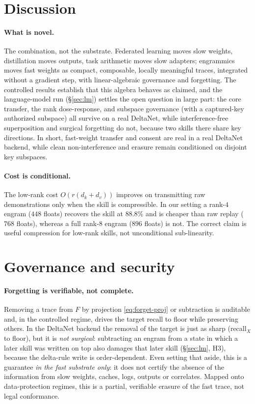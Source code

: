 \documentclass[11pt]{article}
\theoremstyle{definition}
\newcommand{\F}{F}
\newcommand{\dk}{d_k}
\newcommand{\dv}{d_v}
\begin{document}
\section{Discussion}
\label{sec:discussion}

\paragraph{What is novel.}
The combination, not the substrate. Federated learning moves slow weights, distillation moves outputs, task arithmetic moves slow adapters; engrammics moves fast weights as compact, composable, locally meaningful traces, integrated without a gradient step, with linear-algebraic governance and forgetting. The controlled results establish that this algebra behaves as claimed, and the language-model run (\S\ref{sec:lm}) settles the open question in large part: the core transfer, the rank dose-response, and subspace governance (with a captured-key authorized subspace) all survive on a real DeltaNet, while interference-free superposition and surgical forgetting do not, because two skills there share key directions. In short, fast-weight transfer and consent are real in a real DeltaNet backend, while clean non-interference and erasure remain conditioned on disjoint key subspaces.

\paragraph{Cost is conditional.}
The low-rank cost $O(r(\dk+\dv))$ improves on transmitting raw demonstrations only when the skill is compressible. In our setting a rank-$4$ engram ($448$ floats) recovers the skill at $88.8\%$ and is cheaper than raw replay ($768$ floats), whereas a full rank-$8$ engram ($896$ floats) is not. The correct claim is useful compression for low-rank skills, not unconditional sub-linearity.

\section{Governance and security}
\label{sec:governance}

\paragraph{Forgetting is verifiable, not complete.}
Removing a trace from $\F$ by projection \eqref{eq:forget-proj} or subtraction is auditable and, in the controlled regime, drives the target recall to floor while preserving others. In the DeltaNet backend the removal of the target is just as sharp (recall$_X$ to floor), but it is \emph{not surgical}: subtracting an engram from a state in which a later skill was written on top also damages that later skill (\S\ref{sec:lm}, H3), because the delta-rule write is order-dependent. Even setting that aside, this is a guarantee \emph{in the fast substrate only}: it does not certify the absence of the information from slow weights, caches, logs, outputs or correlates. Mapped onto data-protection regimes, this is a partial, verifiable erasure of the fast trace, not legal conformance.
\end{document}
